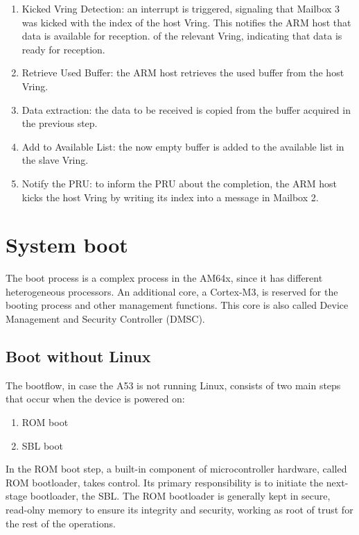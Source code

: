 \begin{enumerate}
    \item   Kicked Vring Detection: an interrupt is triggered, signaling that
            Mailbox 3 was kicked with the index of the host Vring.
            This notifies the ARM host that data is available for reception.
            of the relevant Vring, indicating that data is ready for reception.
    \item   Retrieve Used Buffer: the ARM host retrieves the used buffer
            from the host Vring.
    \item   Data extraction: the data to be received is copied from the buffer
            acquired in the previous step.
    \item   Add to Available List: the now empty buffer is added to the
            available list in the slave Vring.
    \item   Notify the PRU: to inform the PRU about the completion,
            the ARM host kicks the host Vring by writing its index into a
            message in Mailbox 2.
\end{enumerate}

\section{System boot}

The boot process is a complex process in the AM64x, since it has different
heterogeneous processors. An additional core, a Cortex-M3, is reserved for the
booting process and other management functions. This core is also called
Device Management and Security Controller (DMSC).

\subsection{Boot without Linux}

The bootflow, in case the A53 is not running Linux, consists of two main steps
that occur when the device is powered on:

\begin{enumerate}
    \item   ROM boot
    \item   SBL boot
\end{enumerate}

In the ROM boot step, a built-in component of microcontroller hardware, called
ROM bootloader, takes control. Its primary responsibility is to initiate the
next-stage bootloader, the SBL.
The ROM bootloader is generally kept in secure, read-olny memory to ensure its
integrity and security, working as root of trust for the rest of the operations.

